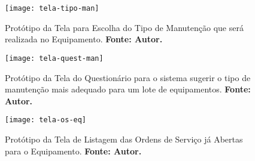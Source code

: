 \begin{apendicesenv}


\graphicspath{{figuras/prototipos/}}
\begin{figure}[H]
\centering
\texttt{[image: tela-tipo-man]}
\caption{Protótipo da Tela para Escolha do Tipo de Manutenção que será realizada no Equipamento. \textbf{Fonte: Autor.}}
\label{tela-tipo-man}
\end{figure}

\graphicspath{{figuras/prototipos/}}
\begin{figure}[H]
\centering
\texttt{[image: tela-quest-man]}
\caption{Protótipo da Tela do Questionário para o sistema sugerir o tipo de manutenção mais adequado para um lote de equipamentos. \textbf{Fonte: Autor.}}
\label{tela-quest-man}
\end{figure}



\graphicspath{{figuras/prototipos/}}
\begin{figure}[H]
\centering
\texttt{[image: tela-os-eq]}
\caption{Protótipo da Tela de Listagem das Ordens de Serviço já Abertas para o Equipamento. \textbf{Fonte: Autor.}}
\label{tela-os-eq}
\end{figure}

\end{apendicesenv}
